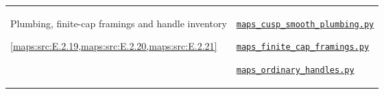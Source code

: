 \documentclass[11pt,a4paper]{article}
\numberwithin{equation}{section}
\theoremstyle{definition}
\newcommand{\SsixRepositoryCommit}{83d76022bcd442278b760db9ff438afceed6c6ea}
\begin{document}
\begin{longtable}{@{}p{}p{}@{}}
\hypertarget{prog:V:framings}{}Plumbing, finite-cap framings and handle inventory\par \cref{maps:src:E.2.19,maps:src:E.2.20,maps:src:E.2.21} &
\href{https://github.com/KokunoYumeto/s6-complex-structure-workbench/blob/\SsixRepositoryCommit/pro_returns/S6_10_PAPERS_checkpoint_15_20261119T1045Z/S6_10_PAPERS/code/III/maps_cusp_smooth_plumbing.py}{\nolinkurl{maps_cusp_smooth_plumbing.py}}\par \href{https://github.com/KokunoYumeto/s6-complex-structure-workbench/blob/\SsixRepositoryCommit/pro_returns/S6_10_PAPERS_checkpoint_15_20261119T1045Z/S6_10_PAPERS/code/III/maps_finite_cap_framings.py}{\nolinkurl{maps_finite_cap_framings.py}}\par \href{https://github.com/KokunoYumeto/s6-complex-structure-workbench/blob/\SsixRepositoryCommit/pro_returns/S6_10_PAPERS_checkpoint_15_20261119T1045Z/S6_10_PAPERS/code/V/replay_chains/code/maps_ordinary_handles.py}{\nolinkurl{maps_ordinary_handles.py}} \\[3pt]
\end{longtable}
\endgroup
\end{document}
